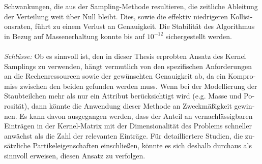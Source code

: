 \begin{otherlanguage}{german}
Schwankungen, die aus der Sampling-Methode resultieren, die zeitliche Ableitung der Verteilung weit 
über Null bleibt. Dies, sowie die effektiv niedrigeren Kollisionsraten, führt zu einem Verlust an 
Genauigkeit. Die Stabilität des Algorithmus in Bezug auf Massenerhaltung konnte bis auf $10^{-12}$ 
sichergestellt werden.
\\ \ \\
\textit{Schlüsse:}
Ob es sinnvoll ist, den in dieser Thesis erprobten Ansatz des Kernel Samplings zu verwenden, 
hängt vermutlich von den spezifischen Anforderungen an die Rechenressourcen sowie der gewünschten 
Genauigkeit ab, da ein Kompromiss zwischen den beiden gefunden werden muss. 
Wenn bei der Modellierung der Staubteilchen mehr als nur ein Attribut berücksichtigt wird 
(e.g. Masse und Porosität), dann könnte die Anwendung dieser Methode an Zweckmäßigkeit gewinnen.
Es kann davon ausgegangen werden, dass der Anteil an vernachlässigbaren Einträgen in der
Kernel-Matrix mit der Dimensionalität des Problems schneller anwächst als die Zahl der relevanten
Einträge. Für detailliertere Studien, die zusätzliche Partikeleigenschaften einschließen, 
könnte es sich deshalb durchaus als sinnvoll erweisen, diesen Ansatz zu verfolgen.

\end{otherlanguage}
